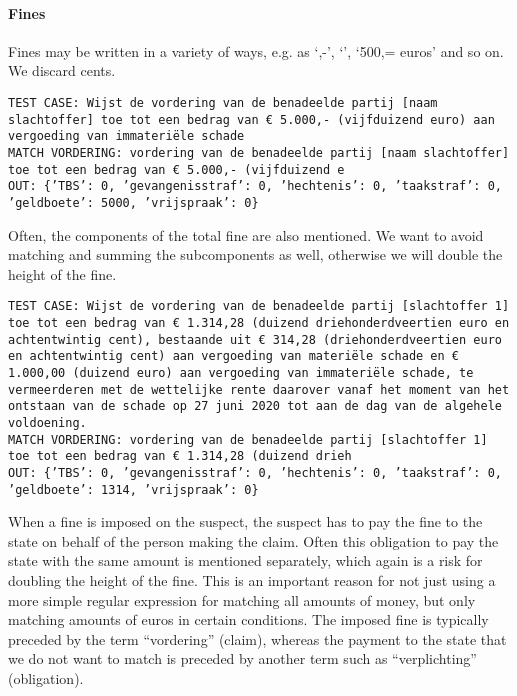 \documentclass[a4paper]{article}
\begin{document}
\paragraph{Fines}

Fines may be written in a variety of ways, e.g. as `,-', `', `500,= euros' and so on.
We discard cents.

\texttt{TEST CASE: %
Wijst de vordering van de benadeelde partij [naam slachtoffer] toe tot een bedrag van € 5.000,- (vijfduizend euro) aan vergoeding van immateriële schade\\
MATCH VORDERING: vordering van de benadeelde partij [naam slachtoffer] toe tot een bedrag van € 5.000,- (vijfduizend e\\
OUT: \{'TBS': 0, 'gevangenisstraf': 0, 'hechtenis': 0, 'taakstraf': 0, 'geldboete': 5000, 'vrijspraak': 0\}}

Often, the components of the total fine are also mentioned. We want to avoid matching and summing the subcomponents as well, otherwise we will double the height of the fine.

\texttt{TEST CASE: %
Wijst de vordering van de benadeelde partij [slachtoffer 1] toe tot een bedrag van  € 1.314,28 (duizend driehonderdveertien euro en achtentwintig cent), bestaande uit € 314,28 (driehonderdveertien euro en achtentwintig cent) aan vergoeding van materiële schade en € 1.000,00 (duizend euro) aan vergoeding van immateriële schade, te vermeerderen met de wettelijke rente daarover vanaf het moment van het ontstaan van de schade op 27 juni 2020 tot aan de dag van de algehele voldoening.\\
MATCH VORDERING: vordering van de benadeelde partij [slachtoffer 1] toe tot een bedrag van  € 1.314,28 (duizend drieh\\
OUT: \{'TBS': 0, 'gevangenisstraf': 0, 'hechtenis': 0, 'taakstraf': 0, 'geldboete': 1314, 'vrijspraak': 0\}}

When a fine is imposed on the suspect, the suspect has to pay the fine to the state on behalf of the person making the claim.
Often this obligation to pay the state with the same amount is mentioned separately, which again is a risk for doubling the height of the fine.
This is an important reason for not just using a more simple regular expression for matching all amounts of money, but only matching amounts of euros in certain conditions.
The imposed fine is typically preceded by the term ``vordering'' (claim), whereas the payment to the state that we do not want to match is preceded by another term such as ``verplichting'' (obligation).
\end{document}

